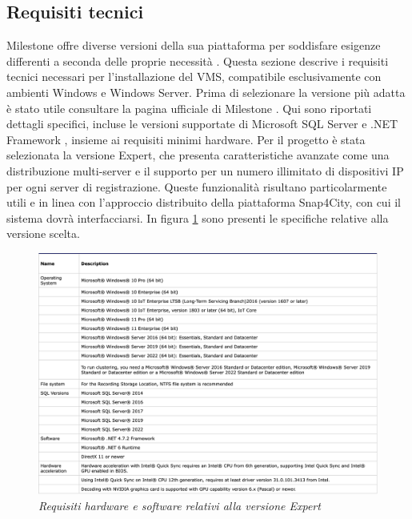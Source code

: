 \documentclass[a4paper, openright, thesis]{report}
\begin{document}
\subsection{Requisiti tecnici}
Milestone offre diverse versioni della sua piattaforma per soddisfare esigenze differenti a seconda delle proprie necessità \cite{xprotect-version}.
Questa sezione descrive i requisiti tecnici necessari per l'installazione del VMS, compatibile esclusivamente con ambienti Windows e Windows Server. Prima di selezionare la versione più adatta è stato utile consultare la pagina ufficiale di Milestone \cite{requirements}. Qui sono riportati dettagli specifici, incluse le versioni supportate di Microsoft SQL Server \cite{SQLserver} e .NET Framework \cite{.NET}, insieme ai requisiti minimi hardware.
Per il progetto è stata selezionata la versione Expert, che presenta caratteristiche avanzate come una distribuzione multi-server e il supporto per un numero illimitato di dispositivi IP per ogni server di registrazione. Queste funzionalità risultano particolarmente utili e in linea con l'approccio distribuito della piattaforma Snap4City, con cui il sistema dovrà interfacciarsi. In figura \ref{req} sono presenti le specifiche relative alla versione scelta.

\begin{figure}[H]
    \centering
    \includegraphics[width=1\linewidth]{img/requirements.png}
    \caption{\textit{Requisiti hardware e software relativi alla versione Expert}}
    \label{req}
\end{figure}
\end{document}
